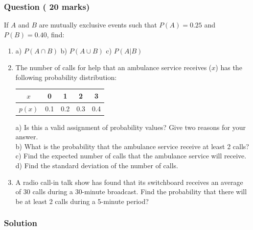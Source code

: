 \documentclass[a4paper,oneside]{book}
\begin{document}
\subsubsection*{Question ( 20 marks)}
If $A$ and $B$ are mutually exclusive events such that $P(A) = 0.25$
and $P(B) = 0.40$, find:
\begin{enumerate}
\item a) $P(A\cap B)$ \quad b) $P(A\cup B)$ \quad c) $P(A|B)$
\item  The number of calls for help that an ambulance service receives ($x$) has the following
      probability distribution:
\begin{center}
\begin{tabular}{|c|cccc|}
\hline
  $x$    &     0     &     1   &     2     &    3 \\
\hline
  $p(x)$ &     0.1   &     0.2 &     0.3   &    0.4 \\
\hline
\end{tabular}
\end{center}
a) Is this a valid assignment of probability values? Give two reasons
for your answer. \\
b)     What is the probability that the ambulance service receive at
least 2 calls? \\
c)     Find the expected number of calls that the ambulance service will receive. \\
d)     Find the standard deviation of the number of calls.
\item A radio call-in talk show has found that its switchboard receives an average of 30 calls
  during a 30-minute broadcast. Find the probability that there will be at least 2 calls during a
  5-minute period?
\end{enumerate}
    

\subsubsection*{Solution}
\end{document}
